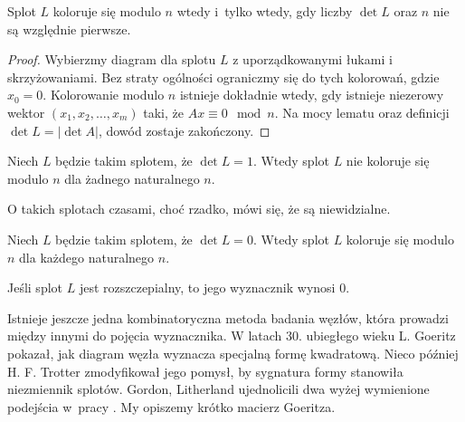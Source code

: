 \begin{proposition}
    \label{prp:colour_det}
    Splot $L$ koloruje się modulo $n$ wtedy i~tylko wtedy, gdy liczby $\det L$ oraz $n$ nie są względnie pierwsze.
\end{proposition}

\begin{proof}
    Wybierzmy diagram dla splotu $L$ z uporządkowanymi łukami i skrzyżowaniami.
    Bez straty ogólności ograniczmy się do tych kolorowań, gdzie $x_0 = 0$.
    Kolorowanie modulo $n$ istnieje dokładnie wtedy, gdy istnieje niezerowy wektor $(x_1, x_2, \ldots, x_m)$ taki, że $Ax \equiv 0 \mod n$.
    Na mocy lematu oraz definicji $\det L = |\det A|$, dowód zostaje zakończony.
\end{proof}

\begin{corollary}
    Niech $L$ będzie takim splotem, że $\det L = 1$.
    Wtedy splot $L$ nie koloruje się modulo $n$ dla żadnego naturalnego $n$.
\end{corollary}

O takich splotach czasami, choć rzadko, mówi się, że są niewidzialne.

\begin{corollary}
    Niech $L$ będzie takim splotem, że $\det L = 0$.
    Wtedy splot $L$ koloruje się modulo $n$ dla każdego naturalnego $n$.
\end{corollary}

\begin{corollary}
    Jeśli splot $L$ jest rozszczepialny, to jego wyznacznik wynosi $0$.
\end{corollary}

Istnieje jeszcze jedna kombinatoryczna metoda badania węzłów, która prowadzi między innymi do pojęcia wyznacznika.
W latach 30. ubiegłego wieku L. Goeritz pokazał, jak diagram węzła wyznacza specjalną formę kwadratową.
Nieco później H. F. Trotter zmodyfikował jego pomysł, by sygnatura formy stanowiła niezmiennik splotów.
Gordon, Litherland ujednolicili dwa wyżej wymienione podejścia w~pracy \cite{litherland81}.
My opiszemy krótko macierz Goeritza.

